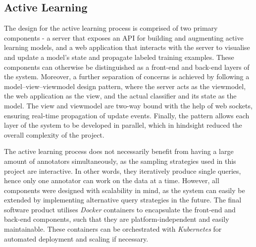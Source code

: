 \documentclass[a4paper,12pt]{article}
\begin{document}
\subsection{Active Learning}
The design for the active learning process is comprised of two primary components - a server that exposes an API for building and augmenting active learning models, and a web application that interacts with the server to visualise and update a model's state and propagate labeled training examples.
These components can otherwise be distinguished as a front-end and back-end layers of the system. Moreover, a further separation of concerns is achieved by following a model–view–viewmodel design pattern, where the server acts as the viewmodel, the web application as the view, and the actual classifier and its state as the model. The view and viewmodel are two-way bound with the help of web sockets, ensuring real-time propagation of update events. Finally, the pattern allows each layer of the system to be developed in parallel, which in hindsight reduced the overall complexity of the project.

\label{sec:docker}
The active learning process does not necessarily benefit from having a large amount of annotators simultaneously, as the sampling strategies used in this project are interactive. In other words, they iteratively produce single queries, hence only one annotator can work on the data at a time. However, all components were designed with scalability in mind, as the system can easily be extended by implementing alternative query strategies in the future.
The final software product utilises \emph{Docker}\cite{merkel2014docker} containers to encapsulate the front-end and back-end components, such that they are platform-independent and easily maintainable. These containers can be orchestrated with \emph{Kubernetes} for automated deployment and scaling if necessary.
\end{document}
